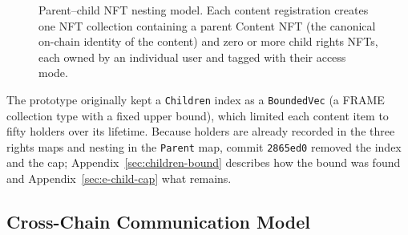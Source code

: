 \begin{figure}[htbp]
\vspace{\baselineskip}
\centering
{}
\caption{Parent--child NFT nesting model. Each content registration creates one NFT collection containing a parent Content NFT (the canonical on-chain identity of the content) and zero or more child rights NFTs, each owned by an individual user and tagged with their access mode.}
\label{fig:nft-nesting}
\end{figure}

The prototype originally kept a \texttt{Children} index as a \texttt{BoundedVec} (a FRAME collection type with a fixed upper bound), which limited each content item to fifty holders over its lifetime. Because holders are already recorded in the three rights maps and nesting in the \texttt{Parent} map, commit \texttt{2865ed0} removed the index and the cap; Appendix~\ref{sec:children-bound} describes how the bound was found and Appendix~\ref{sec:e-child-cap} what remains.

\subsection{Cross-Chain Communication Model}\label{subsec:cross-chain-model}

